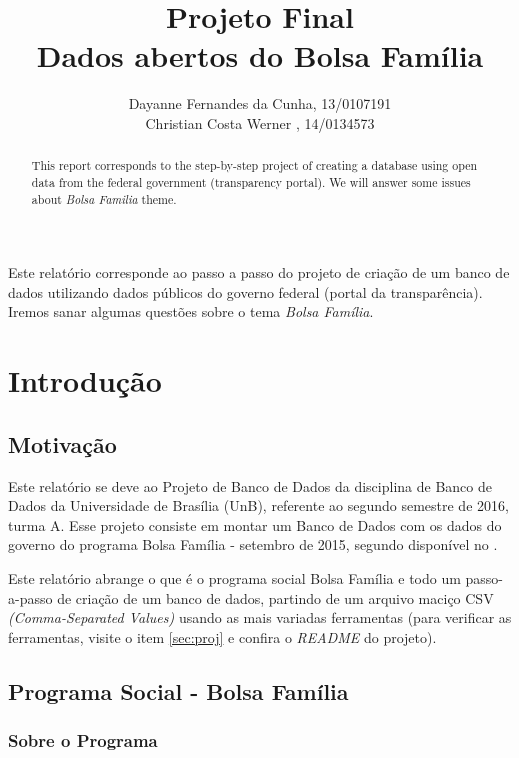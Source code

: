 \documentclass[12pt]{article}
\title{Projeto Final\\ 
	Dados abertos do Bolsa Família}
\author{Dayanne Fernandes da Cunha, 13/0107191\\
	 Christian Costa Werner ,  14/0134573
}
\begin{document}
 
	\maketitle
	
	\begin{abstract}
		This report corresponds to the step-by-step project of creating a database using open data from the federal government (transparency portal). We will answer some issues about \textit{Bolsa Familia} theme.
	\end{abstract}
	
	\begin{resumo} 
		Este relatório corresponde ao passo a passo do projeto de criação de um banco de dados utilizando dados públicos do governo federal (portal da transparência). Iremos sanar algumas questões sobre o tema \textit{Bolsa Família}.
	\end{resumo}
	
	\tableofcontents
	\newpage 
	
	\section{Introdução}
	\label{sec:intro}
	
	\subsection{Motivação}
	\label{sec:motiv}
	
	Este relatório se deve ao Projeto de Banco de Dados da disciplina de Banco de Dados da Universidade de Brasília (UnB), referente ao segundo semestre de 2016, turma A. Esse projeto consiste em montar um Banco de Dados com os dados do governo do programa Bolsa Família - setembro de 2015, segundo disponível no \cite{portal}.
	
	Este relatório abrange o que é o programa social Bolsa Família e todo um passo-a-passo de criação de um banco de dados, partindo de um arquivo maciço CSV \emph{(Comma-Separated Values)} usando as mais variadas ferramentas (para verificar as ferramentas, visite o item \ref{sec:proj} e confira o \emph{README} do projeto).
	
	\subsection{Programa Social - Bolsa Família}
	\label{sec:psbf}
	
	\subsubsection{Sobre o Programa}
	\label{sec:bfsobre}
	
\end{document}
